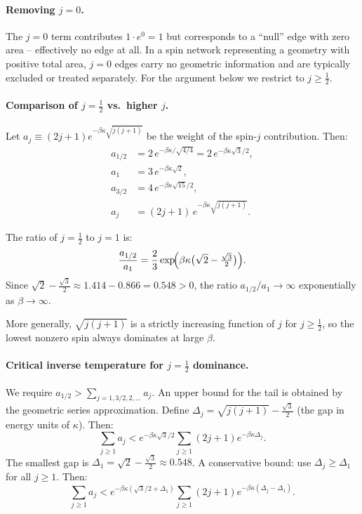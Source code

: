 \documentclass[11pt,a4paper]{article}
\theoremstyle{definition}
\begin{document}
\paragraph{Removing $j=0$.}
The $j=0$ term contributes $1\cdot e^{0}=1$ but corresponds to a ``null''
edge with zero area -- effectively no edge at all.  In a spin network
representing a geometry with positive total area, $j=0$ edges carry no
geometric information and are typically excluded or treated separately.
For the argument below we restrict to $j\geq\tfrac{1}{2}$.

\paragraph{Comparison of $j=\tfrac{1}{2}$ vs.\ higher $j$.}
Let $a_j \equiv (2j+1)e^{-\beta\kappa\sqrt{j(j+1)}}$ be the weight of
the spin-$j$ contribution.  Then:
\begin{align}
  a_{1/2} &= 2\,e^{-\beta\kappa/\sqrt{4/4}} = 2\,e^{-\beta\kappa\sqrt{3}/2},\\
  a_{1}   &= 3\,e^{-\beta\kappa\sqrt{2}},\\
  a_{3/2} &= 4\,e^{-\beta\kappa\sqrt{15}/2},\\
  a_{j}   &= (2j+1)\,e^{-\beta\kappa\sqrt{j(j+1)}}.
\end{align}

The ratio of $j=\tfrac{1}{2}$ to $j=1$ is:
\begin{equation}\label{eqn:ratio}
  \frac{a_{1/2}}{a_{1}}
  = \frac{2}{3}\exp\!\Bigl(
    \beta\kappa\bigl(\sqrt{2}-\tfrac{\sqrt{3}}{2}\bigr)
    \Bigr).
\end{equation}
Since $\sqrt{2}-\frac{\sqrt{3}}{2} \approx 1.414 - 0.866 = 0.548 > 0$,
the ratio $a_{1/2}/a_1\to\infty$ exponentially as $\beta\to\infty$.

More generally, $\sqrt{j(j+1)}$ is a strictly increasing function of $j$
for $j\geq\tfrac{1}{2}$, so the lowest nonzero spin always dominates at
large $\beta$.

\paragraph{Critical inverse temperature for $j=\tfrac{1}{2}$ dominance.}
We require $a_{1/2} > \sum_{j=1,3/2,2,\ldots}a_j$.
An upper bound for the tail is obtained by the geometric series
approximation.  Define $\Delta_j = \sqrt{j(j+1)}-\frac{\sqrt{3}}{2}$
(the gap in energy units of $\kappa$).  Then:
\begin{equation}
  \sum_{j\geq 1}a_j
  < e^{-\beta\kappa\sqrt{3}/2}
    \sum_{j\geq 1}(2j+1)e^{-\beta\kappa\Delta_j}.
\end{equation}
The smallest gap is $\Delta_1 = \sqrt{2}-\frac{\sqrt{3}}{2}\approx 0.548$.
A conservative bound: use $\Delta_j \geq \Delta_1$ for all $j\geq 1$.
Then:
\begin{equation}
  \sum_{j\geq 1}a_j
  < e^{-\beta\kappa(\sqrt{3}/2+\Delta_1)}
    \sum_{j\geq 1}(2j+1)e^{-\beta\kappa(\Delta_j-\Delta_1)}.
\end{equation}
\end{document}
